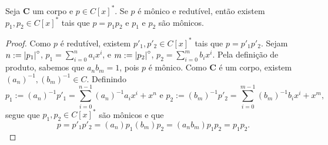 \begin{proposition}
	Seja $\bm C$ um corpo e $p \in C[x]^*$. Se $p$ é mônico e redutível, então existem $p_1,p_2 \in C[x]^*$ tais que $p=p_1p_2$ e $p_1$ e $p_2$ são mônicos.
\end{proposition}
\begin{proof}
	Como $p$ é redutível, existem $p'_1,p'_2 \in C[x]^*$ tais que $p=p'_1p'_2$. Sejam $n := \left\vert{p_1}\right\vert^{\circ}$, $p_1 = \sum_{i=0}^n a_ix^i$, e $m := \left\vert{p_2}\right\vert^{\circ}$, $p_2 = \sum_{i=0}^m b_ix^i$. Pela definição de produto, sabemos que $a_nb_m=1$, pois $p$ é mônico. Como $\bm C$ é um corpo, existem $(a_n)^{-1},(b_m)^{-1} \in C$. Definindo
	\begin{equation*}
	p_1 := (a_n)^{-1}p'_1 = \sum_{i=0}^{n-1} (a_n)^{-1}a_ix^i+ x^n \text{\ \ e\ \ } p_2 := (b_m)^{-1}p'_2 = \sum_{i=0}^{m-1} (b_m)^{-1}b_ix^i + x^m,
	\end{equation*}
segue que $p_1,p_2 \in C[x]^*$ são mônicos e que
	\begin{equation*}
	 p = p'_1p'_2 = (a_n)p_1(b_m)p_2 = (a_nb_m)p_1p_2 = p_1p_2.
	\end{equation*}
\end{proof}

